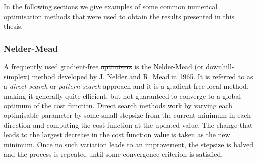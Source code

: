 \documentclass[a4paper,oneside,11pt]{book}
\providecommand{\DIFaddtex}[1]{{\protect\color{blue}\uwave{#1}}} %
\providecommand{\DIFdeltex}[1]{{\protect\color{red}\sout{#1}}}                      %
\providecommand{\DIFaddbegin}{} %
\providecommand{\DIFaddend}{} %
\providecommand{\DIFdelbegin}{} %
\providecommand{\DIFdelend}{} %
\providecommand{\DIFadd}[1]{\texorpdfstring{\DIFaddtex{#1}}{#1}} %
\providecommand{\DIFdel}[1]{\texorpdfstring{\DIFdeltex{#1}}{}} %
\newcommand{\DIFscaledelfig}{0.5}
\newlength{\DIFdelgraphicswidth} %
\newlength{\DIFdelgraphicsheight} %
\newcommand{\DIFaddincludegraphics}[2][]{{\color{blue}\fbox{\DIFOincludegraphics[#1]{#2}}}} %
\newcommand{\DIFdelincludegraphics}[2][]{%
\sbox{\DIFdelgraphicsbox}{\DIFOincludegraphics[#1]{#2}}%
\settoboxwidth{\DIFdelgraphicswidth}{\DIFdelgraphicsbox} %
\settoboxtotalheight{\DIFdelgraphicsheight}{\DIFdelgraphicsbox} %
\scalebox{\DIFscaledelfig}{%
\parbox[b]{\DIFdelgraphicswidth}{\usebox{\DIFdelgraphicsbox}\\[-\baselineskip] \rule{\DIFdelgraphicswidth}{0em}}\llap{\resizebox{\DIFdelgraphicswidth}{\DIFdelgraphicsheight}{%
\setlength{\unitlength}{\DIFdelgraphicswidth}%
\begin{picture}(1,1)%
\thicklines\linethickness{2pt} %
{\color[rgb]{1,0,0}\put(0,0){\framebox(1,1){}}}%
{\color[rgb]{1,0,0}\put(0,0){\line( 1,1){1}}}%
{\color[rgb]{1,0,0}\put(0,1){\line(1,-1){1}}}%
\end{picture}%
}\hspace*{3pt}}} %
} %
\DeclareRobustCommand{\DIFaddbegin}{\DIFOaddbegin \let\includegraphics\DIFaddincludegraphics} %
\DeclareRobustCommand{\DIFaddend}{\DIFOaddend \let\includegraphics\DIFOincludegraphics} %
\DeclareRobustCommand{\DIFdelbegin}{\DIFOdelbegin \let\includegraphics\DIFdelincludegraphics} %
\DeclareRobustCommand{\DIFdelend}{\DIFOaddend \let\includegraphics\DIFOincludegraphics} %
\begin{document}
In the following sections we give examples of some common numerical optimisation methods that were used to obtain the results presented in this thesis.

\subsubsection{Nelder-Mead}\label{sec:3.1.3.1_Nelder_Mead}

A frequently used gradient-free \DIFdelbegin \DIFdel{optimisers }\DIFdelend \DIFaddbegin \DIFadd{optimiser }\DIFaddend is the Nelder-Mead (or downhill-simplex) method \cite{nelder_simplex_1965} developed by J. Nelder and R. Mead in 1965. It is referred to as a \emph{direct search} or \emph{pattern search} approach and it is a gradient-free local method, making it generally quite efficient, but not guaranteed to converge to a global optimum of the cost function. Direct search methods work by varying each optimisable parameter by some small stepsize from the current minimum in each direction and computing the cost function at the updated value. The change that leads to the largest decrease in the cost function value is taken as the new minimum. Once no such variation leads to an improvement, the stepsize is halved and the process is repeated until some convergence criterion is satisfied.
\end{document}
